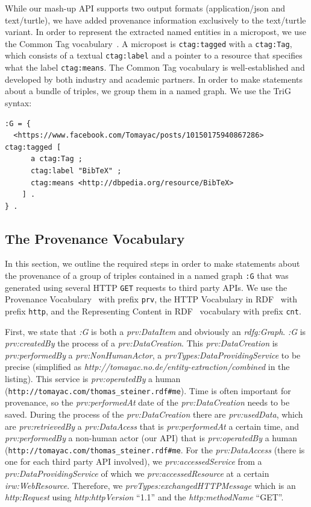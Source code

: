 \documentclass[twocolumn]{article}
\begin{document}
While our mash-up API supports two output formats (application/json and text/turtle), we have added provenance information exclusively to the text/turtle variant. In order to represent the extracted named entities in a micropost, we use the Common Tag vocabulary~\cite{CommonTag:Spec}. A micropost is \texttt{ctag:tagged} with a \texttt{ctag:Tag}, which consists of a textual \texttt{ctag:label} and a pointer to a resource that specifies what the label \texttt{ctag:means}. The Common Tag vocabulary is well-established and developed by both industry and academic partners. In order to make statements about a bundle of triples, we group them in a named graph. We use the TriG~\cite{Bizer:TriG} syntax:
\begin{lstlisting}
:G = {
  <https://www.facebook.com/Tomayac/posts/10150175940867286> ctag:tagged [
      a ctag:Tag ;
      ctag:label "BibTeX" ;
      ctag:means <http://dbpedia.org/resource/BibTeX>
    ] .
} .
\end{lstlisting}

\subsection{The Provenance Vocabulary}                                      \label{sec:provenance}
In this section, we outline the required steps in order to make statements about the provenance of a group of triples contained in a named graph \texttt{:G} that was generated using several HTTP \texttt{GET} requests to third party APIs. We use the Provenance Vocabulary~\cite{Hartig:Provenance} with prefix \texttt{prv}, the HTTP Vocabulary in RDF~\cite{HTTP:RDF} with prefix \texttt{http}, and the Representing Content in RDF~\cite{CNT:RDF} vocabulary with prefix \texttt{cnt}.

First, we state that \emph{:G} is both a \emph{prv:DataItem} and obviously an \emph{rdfg:Graph}. \emph{:G} is \emph{prv:createdBy} the process of a \emph{prv:DataCreation}. This \emph{prv:DataCreation} is \emph{prv:performedBy} a \emph{prv:NonHumanActor}, a \emph{prvTypes:DataProvidingService} to be precise (simplified as \emph{http://tomayac.no.de/entity-extraction/combined} in the listing). This service is \emph{prv:operatedBy} a human (\texttt{http://tomayac.com/thomas\_steiner.rdf\#me}). Time is often important for provenance, so the \emph{prv:performedAt} date of the \emph{prv:DataCreation} needs to be saved. During the process of the \emph{prv:DataCreation} there are \emph{prv:usedData}, which are \emph{prv:retrievedBy} a \emph{prv:DataAcess} that is \emph{prv:performedAt} a certain time, and \emph{prv:performedBy} a non-human actor (our API) that is \emph{prv:operatedBy} a human (\texttt{http://tomayac.com/thomas\_steiner.rdf\#me}. For the \emph{prv:DataAccess} (there is one for each third party API involved), we \emph{prv:accessedService} from a \emph{prv:DataProvidingService} of which we \emph{prv:accessedResource} at a certain \emph{irw:WebResource}. Therefore, we \emph{prvTypes:exchangedHTTPMessage} which is an \emph{http:Request} using \emph{http:httpVersion} ``1.1'' and the \emph{http:methodName} ``GET''.
\end{document}
